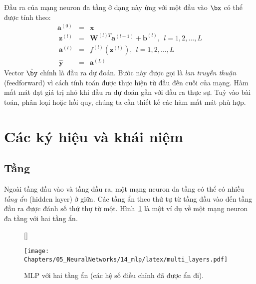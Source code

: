 
Đầu ra của mạng neuron đa tầng ở dạng này ứng với một đầu vào $\bx$ có thể
được tính theo:
\begin{eqnarray} \mathbf{a}^{(0)} &=& \mathbf{x} \\\
\mathbf{z}^{(l)}  &=& \mathbf{W}^{(l)T}\mathbf{a}^{(l-1)} + \mathbf{b}^{(l)},~~ l =  1, 2, \dots, L \\\ 
\mathbf{a}^{(l)} &=& f^{(l)}(\mathbf{z}^{(l)}), ~~ l =  1, 2, \dots, L \\\ 
\mathbf{\hat{y}} &=& \mathbf{a}^{(L)} 
\end{eqnarray} 
Vector $\hat{\by}$ chính là đầu ra dự đoán. Bước này được gọi là \textit{lan truyền thuận} (feedforward) vì cách
tính toán được thực hiện từ đầu đến cuối của mạng. Hàm mất mát đạt
giá trị nhỏ khi đầu ra dự đoán gần với đầu ra thực sự. Tuỳ vào bài toán, phân loại hoặc hồi quy, chúng ta cần thiết kế các hàm mất mát phù hợp.

\section{Các ký hiệu và khái niệm}

\index{tầng -- layer}
 
\subsection{Tầng}
Ngoài tầng đầu vào và tầng đầu ra, một mạng neuron đa tầng có thể có nhiều
\textit{tầng ẩn} ({hidden layer}) ở giữa. Các tầng ẩn theo thứ tự từ tầng đầu
vào đến tầng đầu ra được đánh số thứ thự từ một. Hình~\ref{fig:14_3} là một ví
dụ về một mạng neuron đa tầng với hai tầng ẩn.
 
 
\begin{figure}[t]
    [\FBwidth]
    {\caption{ 
    MLP với hai tầng ẩn (các hệ số điều chỉnh đã được ẩn đi).
    }
    \label{fig:14_3}}
    { %
    \texttt{[image: Chapters/05\_NeuralNetworks/14\_mlp/latex/multi\_layers.pdf]}
    }
\end{figure}

